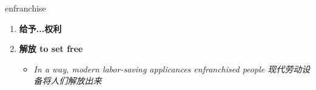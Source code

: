 
\begin{frame}
{\huge enfranchise}
\begin{center}
\begin{enumerate}\Large
  \item \textbf{给予...权利}
  \item \textbf{解放 to set free}
  \begin{itemize}
    \item \em{\Large{In a way, modern labor-saving applicances enfranchised people 现代劳动设备将人们解放出来}}
  \end{itemize}
\end{enumerate}
\end{center}
\end{frame}
